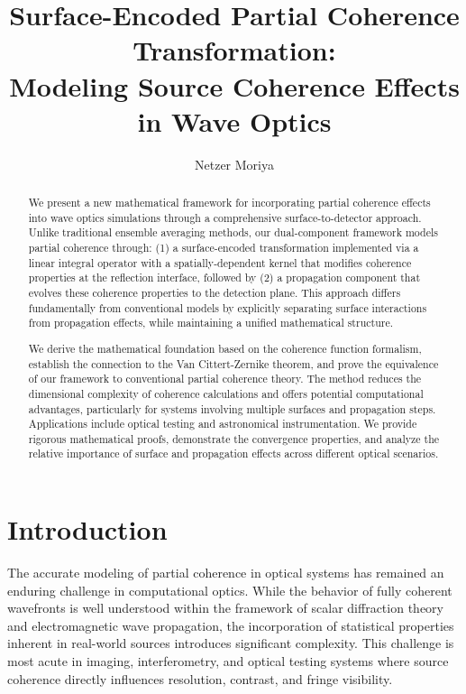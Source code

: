 \documentclass[a4paper,12pt]{article}
\title{Surface-Encoded Partial Coherence Transformation: \\ Modeling Source Coherence Effects in Wave Optics}
\author{Netzer Moriya}
\date{}
\begin{document}
\maketitle

\begin{abstract}
We present a new mathematical framework for incorporating partial coherence effects into wave optics simulations 
through a comprehensive surface-to-detector approach. Unlike traditional ensemble averaging methods, our dual-component 
framework models partial coherence through: (1) a surface-encoded transformation implemented via a linear integral 
operator with a spatially-dependent kernel that modifies coherence properties at the reflection interface, followed by (2) 
a propagation component that evolves these coherence properties to the detection plane. This approach differs fundamentally 
from conventional models by explicitly separating surface interactions from propagation effects, while maintaining a 
unified mathematical structure. 

We derive the mathematical foundation based on the coherence function formalism, establish the connection to the 
Van Cittert-Zernike theorem, and prove the equivalence of our framework to conventional partial coherence theory. 
The method reduces the dimensional complexity of coherence calculations and offers potential computational advantages, 
particularly for systems involving multiple surfaces and propagation steps. Applications include optical testing 
and astronomical instrumentation. We provide rigorous mathematical proofs, demonstrate the convergence properties, 
and analyze the relative importance of surface and propagation effects across different optical scenarios.
\end{abstract}


\section{Introduction}

The accurate modeling of partial coherence in optical systems has remained an enduring challenge in computational optics. 
While the behavior of fully coherent wavefronts is well understood within the framework of scalar diffraction theory and 
electromagnetic wave propagation, the incorporation of statistical properties inherent in real-world sources introduces 
significant complexity. This challenge is most acute in imaging, interferometry, and optical testing systems where 
source coherence directly influences resolution, contrast, and fringe visibility.
\end{document}
